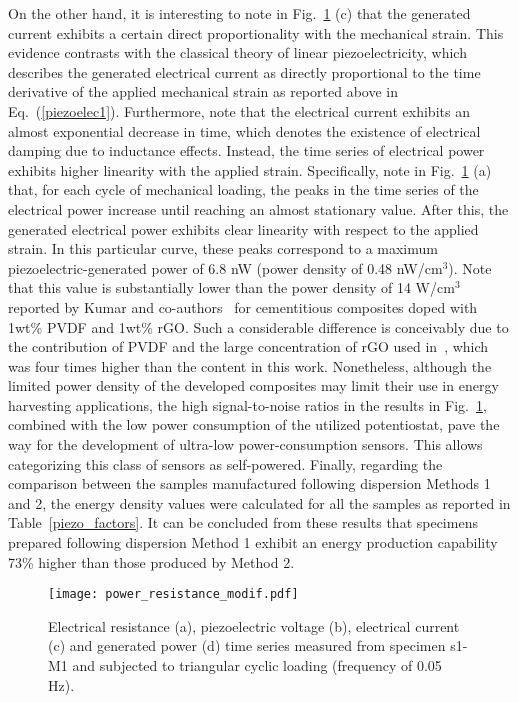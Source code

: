 \documentclass[a4paper,fleqn]{cas-sc}
\begin{document}
On the other hand, it is interesting to note in Fig.~\ref{power_resistance} (c) that the generated current exhibits a certain direct proportionality with the mechanical strain. This evidence contrasts with the classical theory of linear piezoelectricity, which describes the generated electrical current as directly proportional to the time derivative of the applied mechanical strain as reported above in Eq.~(\ref{piezoelec1}). Furthermore, note that the electrical current exhibits an almost exponential decrease in time, which denotes the existence of electrical damping due to inductance effects. Instead, the time series of electrical power exhibits higher linearity with the applied strain. Specifically, note in Fig.~\ref{power_resistance} (a) that, for each cycle of mechanical loading, the peaks in the time series of the electrical power increase until reaching an almost stationary value. After this, the generated electrical power exhibits clear linearity with respect to the applied strain. In this particular curve, these peaks correspond to a maximum piezoelectric-generated power of 6.8 nW (power density of 0.48 nW/$\mathrm{cm^3}$). Note that this value is substantially lower than the power density of 14 {\textmu}W/cm$^3$ reported by Kumar and co-authors~\cite{KUMAR2017174} for cementitious composites doped with 1wt\% PVDF and 1wt\% rGO. Such a considerable difference is conceivably due to the contribution of PVDF and the large concentration of rGO used in~\cite{KUMAR2017174}, which was four times higher than the content in this work. Nonetheless, although the limited power density of the developed composites may limit their use in energy harvesting applications, the high signal-to-noise ratios in the results in Fig.~\ref{power_resistance}, combined with the low power consumption of the utilized potentiostat, pave the way for the development of ultra-low power-consumption sensors. This allows categorizing this class of sensors as self-powered. Finally, regarding the comparison between the samples manufactured following dispersion Methods 1 and 2, the energy density values were calculated for all the samples as reported in Table~\ref{piezo_factors}. It can be concluded from these results that specimens prepared following dispersion Method 1 exhibit an energy production capability 73\% higher than those produced by Method 2.


\begin{figure}[ht]
\centering
\texttt{[image: power\_resistance\_modif.pdf]}
\caption{Electrical resistance (a), piezoelectric voltage (b), electrical current (c) and generated power (d) time series measured from specimen s1-M1 and subjected to triangular cyclic loading (frequency of 0.05 Hz).}
\label{power_resistance}
\end{figure}
\end{document}
